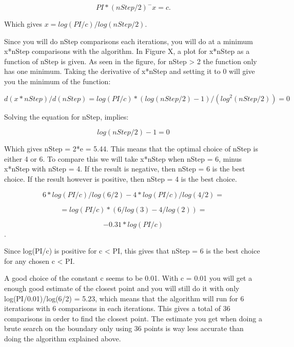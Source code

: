 \documentclass[paper=a4, fontsize=11pt,twoside]{scrartcl}		%
\begin{document}
\begin{flushleft}
$$PI*(nStep/2)^-x = c.$$

Which gives $x = log(PI/c)/log(nStep/2)$.

Since you will do nStep comparisons each iterations, you will do at a minimum x*nStep comparisons with the algorithm. In Figure X, a plot for x*nStep  as a function of nStep is given. As seen in the figure, for nStep > 2 the function only has one minimum. Taking the derivative of x*nStep and setting it to 0 will give you the minimum of the function:

$$d(x*nStep)/d(nStep) = log(PI/c)*(log(nStep/2) - 1)/(log^2(nStep/2)) = 0$$

Solving the equation for nStep, implies:

$$log(nStep/2) - 1 = 0$$

Which gives nStep = 2*e = 5.44. This means that the optimal choice of nStep is either 4 or 6. To compare this we will take x*nStep when nStep = 6, minus x*nStep with nStep = 4. If the result is negative, then nStep = 6 is the best choice. If the result however is positive, then nStep = 4 is the best choice.

$$6*log(PI/c)/log(6/2) - 4*log(PI/c)/log(4/2) = $$

$$ = log(PI/c)*(6/log(3) - 4/log(2)) = $$

$$ -0.31*log(PI/c)$$.

Since log(PI/c) is positive for c < PI, this gives that nStep = 6 is the best choice for any chosen c < PI. \newline

A good choice of the constant c seems to be 0.01. With c = 0.01 you will get a enough good estimate of the closest point and you will still do it with only log(PI/0.01)/log(6/2) = 5.23, which means that the algorithm will run for 6 iterations with 6 comparisons in each iterations. This gives a total of 36 comparisons in order to find the closest point. The estimate you get when doing a brute search on the boundary only using 36 points is way less accurate than doing the algorithm explained above. \newline


\end{flushleft}
\end{document}
